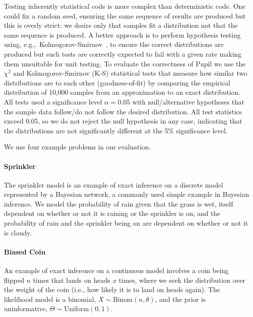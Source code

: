 \documentclass[sigconf]{acmart}
\newcommand{\pupil}{Pupil\xspace}
\begin{document}
Testing inherently statistical code is more complex than deterministic code. One could fix a random seed, ensuring the same sequence of results are produced but this is overly strict: we desire only that samples fit a distribution not that the same sequence is produced. A better approach is to perform hypothesis testing using, e.g.,~Kolmogorov-Smirnov~\cite{massey1951kolmogorov}, to ensure the correct distributions are produced but such tests are correctly expected to fail with a given rate making them unsuitable for unit testing. To evaluate the correctness of \pupil we use the $\chi^2$ and Kolmogorov-Smirnov (K-S) statistical tests that measure how similar two distributions are to each other (goodness-of-fit) by comparing the empirical distribution of 10,000 samples from an approximation to an exact distribution. All tests used a significance level $\alpha = 0.05$ with null/alternative hypotheses that the sample data follow/do not follow the desired distribution. All test statistics exceed 0.05, so we do not reject the null hypothesis in any case, indicating that the distributions are not significantly different at the 5\% significance level.

We use four example problems in our evaluation.

\paragraph{Sprinkler}
The sprinkler model is an example of exact inference on a discrete model represented by a Bayesian network, %
a commonly used simple example in Bayesian inference. We model the probability of rain given that the grass is wet, itself dependent on whether or not it is raining or the sprinkler is on, and the probability of rain and the sprinkler being on are dependent on whether or not it is cloudy.

\paragraph{Biased Coin}
An example of exact inference on a continuous model involves a coin being flipped $n$ times that lands on heads $x$ times, where we seek the distribution over the weight of the coin (i.e., how likely it is to land on heads again). The likelihood model is a binomial, $X \sim \text{Binom}(n,\theta)$, and the prior is uninformative, $\Theta \sim \text{Uniform}(0,1)$.
\end{document}

